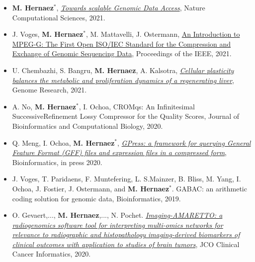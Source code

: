 \documentclass[11pt,a4paper,sans]{moderncv}        %
\begin{document}
\begin{itemize}

\item \textbf{M. Hernaez}$^\ast$, \href{https://www.nature.com/articles/s43588-021-00089-w}{\textsl{Towards scalable Genomic Data Access}}, Nature Computational Sciences, 2021.\\

\item J. Voges, \textbf{M. Hernaez}$^\ast$, M. Mattavelli, J. Ostermann, \href{https://ieeexplore.ieee.org/abstract/document/9455132}{An Introduction to MPEG-G: The First Open ISO/IEC Standard for the Compression and Exchange of Genomic Sequencing Data}, Proceedings of the IEEE, 2021.\\

\item U. Chembazhi, S. Bangru, \textbf{M. Hernaez}, A. Kalsotra, \href{https://genome.cshlp.org/content/early/2021/03/01/gr.267013.120}{\textsl{Cellular plasticity balances the metabolic and proliferation dynamics of a regenerating liver}}, Genome Research, 2021.\\

\item A. No, \textbf{M. Hernaez}$^\ast$, I. Ochoa, CROMqs: An Infinitesimal SuccessiveRefinement Lossy Compressor for the Quality Scores, Journal of Bioinformatics and Computational Biology, 2020.\\

\item Q. Meng, I. Ochoa, \textbf{M. Hernaez}$^\ast$,  \href{https://www.biorxiv.org/content/10.1101/833087v1.full}{\textsl{GPress: a framework for querying General Feature Format (GFF) files and expression files in a compressed form}}, Bioinformatics, in press 2020.\\

\item J. Voges, T. Paridaens, F. Muntefering, L. S.Mainzer, B. Bliss, M. Yang, I. Ochoa, J. Fostier, J. Ostermann, and \textbf{M. Hernaez}$^\ast$. GABAC: an arithmetic coding solution for genomic data, Bioinformatics, 2019. \\

\item O. Gevaert,..., \textbf{M. Hernaez},..., N. Pochet. \href{https://doi.org/10.1101/2020.10.06.327601}{\textsl{Imaging-AMARETTO: a radiogenomics software tool for interpreting multi-omics networks for relevance to radiographic and histopathology imaging-derived biomarkers of clinical outcomes with application to studies of brain tumors}},  JCO Clinical Cancer Informatics, 2020. \\


\end{itemize}
\end{document}
